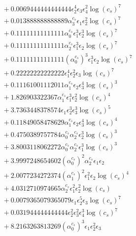 \documentclass[10pt]{article}
\begin{document}
\begin{align*}
&{}  + 0.0069444444444444 \epsilon_{2}^{4} \epsilon_{3} \epsilon_{4}^{2} \log{\left(c_{s} \right)}^{7} \\
&{}  + 0.013888888888889 \alpha_{3}^{c_s} \epsilon_{1} \epsilon_{2}^{2} \log{\left(c_{s} \right)}^{7} \\
&{}  + 0.11111111111111 \alpha_{0}^{c_s} \epsilon_{1}^{3} \epsilon_{2}^{3} \log{\left(c_{s} \right)}^{7} \\
&{}  + 0.11111111111111 \alpha_{2}^{c_s} \epsilon_{1}^{3} \epsilon_{2} \log{\left(c_{s} \right)}^{7} \\
&{}  + 0.11111111111111 \left(\alpha_{0}^{c_s}\right)^{3} \epsilon_{1}^{3} \epsilon_{2} \log{\left(c_{s} \right)}^{7} \\
&{}  + 0.22222222222222 \epsilon_{1}^{4} \epsilon_{2}^{2} \epsilon_{3} \log{\left(c_{s} \right)}^{7} \\
&{}  + 0.11161001112011 \alpha_{1}^{c_s} \epsilon_{2} \epsilon_{3}^{4} \log{\left(c_{s} \right)}^{3} \\
&{}  + 1.826903322367 \alpha_{1}^{c_s} \epsilon_{1}^{3} \epsilon_{2}^{2} \log{\left(c_{s} \right)}^{4} \\
&{}  + 3.7363448378574 \epsilon_{1} \epsilon_{2}^{3} \epsilon_{3}^{3} \log{\left(c_{s} \right)}^{5} \\
&{}  + 0.11849058478629 \alpha_{1}^{c_s} \epsilon_{2} \epsilon_{3}^{4} \log{\left(c_{s} \right)}^{4} \\
&{}  + 0.4750389757784 \alpha_{0}^{c_s} \alpha_{2}^{c_s} \epsilon_{2}^{3} \log{\left(c_{s} \right)}^{3} \\
&{}  + 3.8003118062272 \alpha_{0}^{c_s} \alpha_{2}^{c_s} \epsilon_{1}^{3} \log{\left(c_{s} \right)}^{3} \\
&{}  + 3.9997248654602 \left(\alpha_{0}^{c_s}\right)^{2} \alpha_{2}^{c_s} \epsilon_{1} \epsilon_{2} \\
&{}  + 2.0077234272374 \left(\alpha_{1}^{c_s}\right)^{2} \epsilon_{1}^{2} \epsilon_{2} \log{\left(c_{s} \right)}^{4} \\
&{}  + 4.0312710974665 \alpha_{2}^{c_s} \epsilon_{1}^{2} \epsilon_{2}^{2} \log{\left(c_{s} \right)} \\
&{}  + 0.0079365079365079 \epsilon_{1} \epsilon_{2}^{5} \epsilon_{3} \log{\left(c_{s} \right)}^{7} \\
&{}  + 0.031944444444444 \epsilon_{2}^{2} \epsilon_{3}^{2} \epsilon_{4}^{3} \log{\left(c_{s} \right)}^{7} \\
&{}  + 8.2163263813269 \left(\alpha_{0}^{c_s}\right)^{3} \epsilon_{1} \epsilon_{2}^{2} \epsilon_{3} \\

\end{align*}
\end{document}

